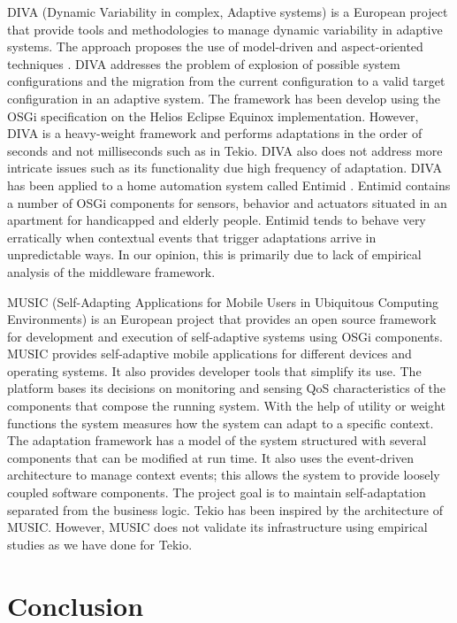\documentclass{acm_proc_article-sp}
\begin{document}
DIVA (Dynamic Variability in complex, Adaptive systems) is a European project that provide tools and methodologies to manage dynamic variability in adaptive systems. The approach proposes the use of model-driven and aspect-oriented techniques \cite{Romero2010}. DIVA addresses the problem of explosion of possible system configurations and the migration from the current configuration to a valid target configuration \cite{Morin2009} in an adaptive system.  The framework has been develop using the OSGi specification on the Helios Eclipse Equinox implementation. However, DIVA is a heavy-weight framework and performs adaptations in the order of seconds and not milliseconds such as in Tekio. DIVA also does not address more intricate issues such as its functionality due  high frequency of adaptation. DIVA has been applied to a home automation system called Entimid \cite{nain2009}. Entimid contains a number of OSGi components for sensors, behavior and actuators situated in an apartment for handicapped and elderly people. Entimid tends to behave very erratically when contextual events that trigger adaptations arrive in unpredictable ways. In our opinion, this is primarily due to lack of empirical analysis of the middleware framework.

MUSIC (Self-Adapting Applications for Mobile Users in Ubiquitous Computing Environments) \cite{Rouvoy2008} is an European project  that provides an open source framework for development and execution of self-adaptive systems using OSGi components. MUSIC provides self-adaptive mobile applications for different devices and operating systems. It also provides developer tools that simplify its use. The platform bases its decisions on monitoring and sensing QoS characteristics of the components that compose the running system. With the help of utility or weight functions the system measures how the system can adapt to a specific context. The adaptation framework has a model of the system structured with several components that can be modified at run time. It also uses the event-driven architecture to manage context events; this allows the system to provide loosely coupled software components. The project goal is to maintain self-adaptation separated from the business logic. Tekio has been inspired by the architecture of MUSIC. However, MUSIC does not validate its infrastructure using empirical studies as we have done for Tekio.

\section{Conclusion}
\label{sec:conclusion}
\end{document}
